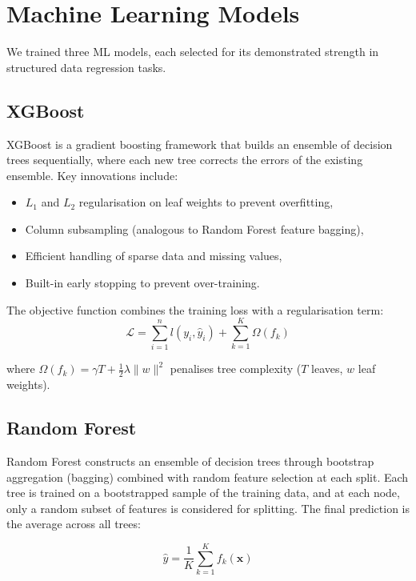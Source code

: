 \documentclass[12pt,a4paper,oneside]{report}
\begin{document}
\section{Machine Learning Models}

We trained three ML models, each selected for its demonstrated strength in structured data regression tasks.

\subsection{XGBoost}

XGBoost \citep{chen2016xgboost} is a gradient boosting framework that builds an ensemble of decision trees sequentially, where each new tree corrects the errors of the existing ensemble. Key innovations include:

\begin{itemize}[nosep]
    \item $L_1$ and $L_2$ regularisation on leaf weights to prevent overfitting,
    \item Column subsampling (analogous to Random Forest feature bagging),
    \item Efficient handling of sparse data and missing values,
    \item Built-in early stopping to prevent over-training.
\end{itemize}

The objective function combines the training loss with a regularisation term:
\begin{equation}
\mathcal{L} = \sum_{i=1}^{n} l(y_i, \hat{y}_i) + \sum_{k=1}^{K} \Omega(f_k)
\end{equation}

\noindent where $\Omega(f_k) = \gamma T + \frac{1}{2}\lambda \|w\|^2$ penalises tree complexity ($T$ leaves, $w$ leaf weights).

\subsection{Random Forest}

Random Forest \citep{breiman2001random} constructs an ensemble of decision trees through bootstrap aggregation (bagging) combined with random feature selection at each split. Each tree is trained on a bootstrapped sample of the training data, and at each node, only a random subset of features is considered for splitting. The final prediction is the average across all trees:

\begin{equation}
\hat{y} = \frac{1}{K}\sum_{k=1}^{K} f_k(\mathbf{x})
\end{equation}
\end{document}
